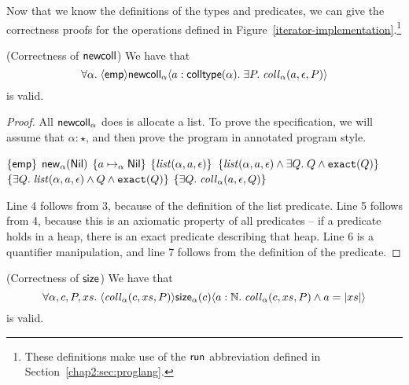 Now that we know the definitions of the types and predicates, we can
give the correctness proofs for the operations defined in
Figure~\ref{iterator-implementation}.\footnote{These definitions make
use of the $\mathsf{run}$ abbreviation defined in Section~\ref{chap2:sec:proglang}.}

\begin{lemma}{(Correctness of $\mathsf{newcoll}$)}
  We have that 
  \begin{displaymath}
    \forall \alpha.\; \langle{\mathsf{emp}}\rangle{\mathsf{newcoll}_\alpha}\langle{a:\mathsf{colltype}(\alpha)}.\;{\exists P.\; \mathit{coll}_\alpha(a, \epsilon,P)}\rangle
  \end{displaymath}
  is valid. 
\end{lemma}

\begin{proof}
All $\mathsf{newcoll}_\alpha$ does is allocate a list. To prove the
specification, we will assume that $\alpha:\star$, and then prove the
program in annotated program style.

\begin{specification}
\nextline $\{{\mathsf{emp}}\}$ 
\nextline $\mathsf{new}_{\alpha}(\mathsf{Nil})$ 
\nextline $\{{a \mapsto_\alpha \mathsf{Nil}}\}$ 
\nextline $\{{\mathit{list}(\alpha, a, \epsilon)}\}$ 
\nextline $\{{\mathit{list}(\alpha, a, \epsilon) \land \exists Q.\; Q \land \mathtt{exact}({Q})}\}$ 
\nextline $\{{\exists Q.\;\mathit{list}(\alpha, a, \epsilon) \land Q \land \mathtt{exact}({Q})}\}$ 
\nextline $\{{\exists Q.\; \mathit{coll}_\alpha(a, \epsilon, Q)}\}$ 
\end{specification}

Line 4 follows from 3, because of the definition of the list predicate. Line 5 
follows from 4, because this is an axiomatic property of all predicates -- if
a predicate holds in a heap, there is an exact predicate describing that heap. Line 6 
is a quantifier manipulation, and line 7 follows from the definition of the predicate.
\end{proof}

\begin{lemma}{(Correctness of $\mathsf{size}$)}
We have that 
\begin{displaymath}
\forall \alpha, c, P, xs.\; \langle{\mathit{coll}_\alpha(c, xs, P)}\rangle{\mathsf{size}_\alpha(c)}\langle{a:\mathbb{N}}.\;{\mathit{coll}_\alpha(c, xs, P) \land a = |xs|}\rangle
\end{displaymath}
is valid.   
\end{lemma}

